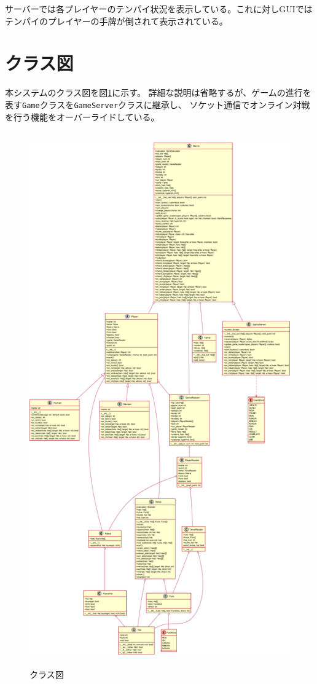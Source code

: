 \documentclass[a4j,titlepage]{jsarticle}
\begin{document}
サーバーでは各プレイヤーのテンパイ状況を表示している。これに対しGUIではテンパイのプレイヤーの手牌が倒されて表示されている。

\newpage
\section{クラス図}
本システムのクラス図を図\ref{fig:class}に示す。
詳細な説明は省略するが、ゲームの進行を表す\texttt{Game}クラスを\texttt{GameServer}クラスに継承し、
ソケット通信でオンライン対戦を行う機能をオーバーライドしている。

\begin{figure}[p]
  \centering
  \includegraphics[height=23cm]{images/mahjong.pdf}
  \caption{クラス図}
  \label{fig:class}
\end{figure}
\end{document}
